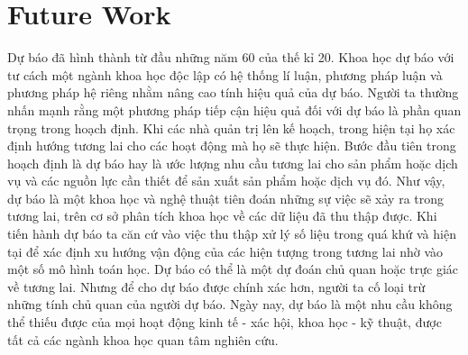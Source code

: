 \section{Future Work}
\label{sec:intro:khainiem}
Dự báo đã hình thành từ đầu những năm 60 của thế kỉ 20. Khoa học dự báo với tư cách một ngành khoa học độc lập có hệ thống lí luận, phương pháp luận và phương pháp hệ riêng nhằm nâng cao tính hiệu quả của dự báo. Người ta thường nhấn mạnh rằng một phương pháp tiếp cận hiệu quả đối với dự báo là phần quan trọng trong hoạch định. Khi các nhà quản trị lên kế hoạch, trong hiện tại họ xác định hướng tương lai cho các hoạt động mà họ sẽ thực hiện. Bước đầu tiên trong hoạch định là dự báo hay là ước lượng nhu cầu tương lai cho sản phẩm hoặc dịch vụ và các nguồn lực cần thiết để sản xuất sản phẩm hoặc dịch vụ đó.
Như vậy, dự báo là một khoa học và nghệ thuật tiên đoán những sự việc sẽ xảy ra trong tương lai, trên cơ sở phân tích khoa học về các dữ liệu đã thu thập được.
Khi tiến hành dự báo ta căn cứ vào việc thu thập xử lý số liệu trong quá khứ và hiện tại để xác định xu hướng vận động của các hiện tượng trong tương lai nhờ vào một số mô hình toán học.
Dự báo có thể là một dự đoán chủ quan hoặc trực giác về tương lai. Nhưng để cho dự báo được chính xác hơn, người ta cố loại trừ những tính chủ quan của người dự báo.
Ngày nay, dự báo là một nhu cầu không thể thiếu được của mọi hoạt động kinh tế - xác hội, khoa học - kỹ thuật, được tất cả các ngành khoa học quan tâm nghiên cứu.
